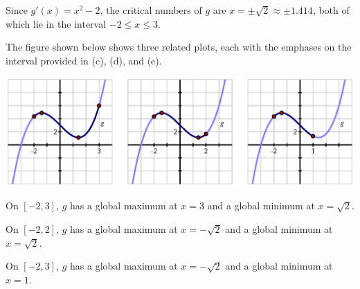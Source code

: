 \begin{activitySolution}
	\ba
	\item Since $g'(x) = x^2 - 2$, the critical numbers of $g$ are $x = \pm \sqrt{2} \approx \pm 1.414$, both of which lie in the interval $-2 \le x \le 3$.
	\item The figure shown below shows three related plots, each with the emphases on the interval provided in (c), (d), and (e).
	\begin{center}
	\includegraphics{figures/3_3_Act1Soln.eps}
	\end{center}
	\item On $[-2,3]$, $g$ has a global maximum at $x = 3$ and a global minimum at $x = \sqrt{2}$.
	\item On $[-2,2]$, $g$ has a global maximum at $x = -\sqrt{2}$ and a global minimum at $x = \sqrt{2}$.
	\item On $[-2,3]$, $g$ has a global maximum at $x = -\sqrt{2}$ and a global minimum at $x = 1$.
	\ea
\end{activitySolution}
\aftera